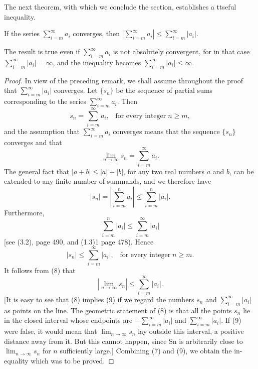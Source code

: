The next theorem, with which we conclude the section, establishes a ttseful inequality.


\begin{theorem} %
If the series $\sum_{i=m}^{\infty} a_i$ converges, then $|\sum_{i=m}^{\infty} a_i| \leq \sum_{i=m}^{\infty} |a_i|$.
\end{theorem}

The result is true even if $\sum_{i=m}^{\infty} a_i$ is not absolutely convergent, for in that case $\sum_{i=m}^{\infty} |a_i| = \infty$, and the inequality becomes $\sum_{i=m}^{\infty} |a_i| \leq \infty$.

\begin{proof}
In view of the preceding remark, we shall assume throughout the proof that $\sum_{i=m}^{\infty} |a_i|$ converges. Let $\{s_n\}$ be the sequence of partial sums corresponding to the series $\sum_{i=m}^{\infty} a_i$. Then
$$
s_n = \sum_{i=m}^{\infty} a_i, \;\;\;\mbox{for every integer}\; n \geq m,  
$$
\noindent and the assumption that $\sum_{i=m}^{\infty} a_i$ converges means that the sequence $\{ s_n \}$ converges and that  
\begin{equation}
\lim_{n \rightarrow \infty} s_n = \sum_{i=m}^{\infty} a_i .  
\label{eq9.5.7}
\end{equation}
The general fact that $|a + b| \leq |a| + |b|$, for any two real numbers $a$ and $b$, can be extended to any finite number of summands, and we therefore have
$$
|s_n| = |\sum_{i=m}^{n} a_i| \leq \sum_{i=m}^{n} |a_i| .
$$
Furthermore,
$$
\sum_{i=m}^{n} |a_i| \leq \sum_{i=m}^{\infty} |a_i|
$$
[see (3.2), page 490, and (1.3)1 page 478). Hence
\begin{equation}
|s_n| \leq \sum_{i=m}^{\infty} |a_i|, \;\;\;\mbox{for every integer}\; n \geq m. 
\label{eq9.5.8}
\end{equation}
It follows from (8) that  
\begin{equation}
|\lim_{n \rightarrow \infty} s_n | \leq \sum_{i=m}^{\infty} |a_i| .
\label{eq9.5.9}
\end{equation}
[It is easy to see that (8) implies (9) if we regard the numbers $s_n$ and $\sum_{i=m}^{\infty} |a_i|$ as points on the line. The geometric statement of (8) is that all the points $s_n$ lie in the closed interval whose endpoints are $-\sum_{i=m}^{\infty} |a_i|$ and $\sum_{i=m}^{\infty} |a_i|$. If
(9) were false, it would mean that $\lim_{n \rightarrow \infty} s_n$ lay outside this interval, a positive distance away from it. But this cannot happen, since Sn is arbitrarily close to $\lim_{n \rightarrow \infty} s_n$ for $n$ sufficiently large.] Combining (7) and (9), we obtain the in-equality which was to be proved.
\end{proof}
